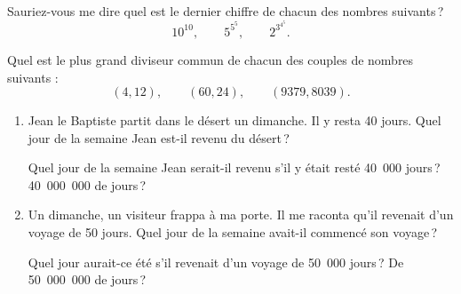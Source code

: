 %
\begin{exo}\label{exo:arith-29}
	Sauriez-vous me dire quel est le dernier chiffre de chacun des nombres suivants\,?
		\[ 
			10^{10}			,\qquad
			5^{5^{5}}			,\qquad
			2^{3^{4^{5}}} 	.
		\]
\end{exo}
%
\begin{exo}\label{exo:arith-30}
	Quel est le plus grand diviseur commun de chacun des couples de nombres suivants :
	\[
		(4,12)				,\qquad
		(60,24)			,\qquad
		(9379,8039)		.
	\]
\end{exo}
%
\begin{exo}\label{exo:arith-31}
	\begin{enumerate}
		\item 
				Jean le Baptiste partit dans le d\'esert un dimanche.
			Il y resta 40 jours.
			Quel jour de la semaine Jean est-il revenu du d\'esert\,?
			
				Quel jour de la semaine Jean serait-il revenu s'il y \'etait rest\'e 40~000 jours\,? 40~000~000 de jours\,?
		\item 
			Un dimanche, un visiteur frappa \`a ma porte.
				Il me raconta qu'il revenait d'un voyage de 50 jours.
				Quel jour de la semaine avait-il commenc\'e son voyage\,?
			
				Quel jour aurait-ce \'et\'e s'il revenait d'un voyage de 50~000 jours\,? De 50~000~000 de jours\,?
	\end{enumerate}
\end{exo}
%
